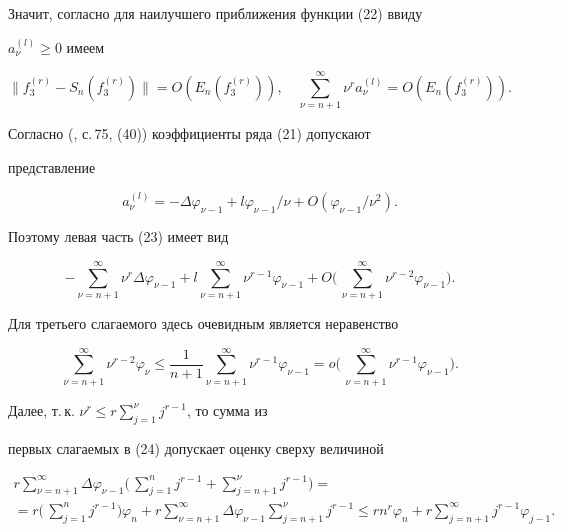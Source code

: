 Значит, согласно \cite{Cen} для наилучшего приближения функции (22) ввиду


$a^{(l)}_\nu\ge 0$ имеем


\begin{equation}


\|f^{(r)}_3-S_n(f^{(r)}_3)\|=O(E_n(f^{(r)}_3)),\quad


\sum^\infty_{\nu=n+1}\nu^ra^{(l)}_\nu=O(E_n(f^{(r)}_3)).


\end{equation}


Согласно (\cite{Ge1}, с.\,75, (40)) коэффициенты ряда (21) допускают


представление


$$


a^{(l)}_\nu=-\Delta\varphi_{\nu-1}+l\varphi_{\nu-1}/\nu


+O(\varphi_{\nu-1}/\nu^2).


$$


Поэтому левая часть (23) имеет вид


\begin{equation}


-\sum^\infty_{\nu=n+1}\nu^r\Delta\varphi_{\nu-1}+l


\sum^\infty_{\nu=n+1}\nu^{r-1}\varphi_{\nu-1}+O\biggl(\,


\sum^\infty_{\nu=n+1}\nu^{r-2}\varphi_{\nu-1}\biggr).


\end{equation}


Для третьего слагаемого здесь очевидным является неравенство


\begin{equation}


\sum^\infty_{\nu=n+1}\nu^{r-2}\varphi_\nu\le\frac{1}{n+1}


\sum^\infty_{\nu=n+1}\nu^{r-1}\varphi_{\nu-1}=o\biggl(\,


\sum^\infty_{\nu=n+1}\nu^{r-1}\varphi_{\nu-1}\biggr).


\end{equation}


Далее, т.\,к. $\nu^r\le r\sum\limits^\nu_{j=1}j^{r-1}$, то сумма из


первых слагаемых в (24) допускает оценку сверху величиной


\begin{multline*}


r\sum^\infty_{\nu=n+1}\Delta\varphi_{\nu-1}\biggl(\,


\sum^n_{j=1}j^{r-1}+\sum^\nu_{j=n+1}j^{r-1}\biggr)=\\


%


=r\biggl(\,\sum^n_{j=1}j^{r-1}\biggr)\varphi_n+


r\sum^\infty_{\nu=n+1}\Delta\varphi_{\nu-1}\sum^\nu_{j=n+1}


j^{r-1}\le rn^r\varphi_n+r\sum^\infty_{j=n+1}j^{r-1}\varphi_{j-1}.


\end{multline*}


